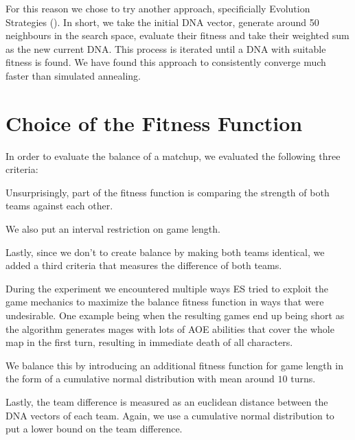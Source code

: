 For this reason we chose to try another approach, specificially Evolution
Strategies (). In short, we take the initial DNA vector,
generate around 50 neighbours in the search space, evaluate their fitness
and take their weighted sum as the new current DNA. This process is iterated
until a DNA with suitable fitness is found. We have found this approach to
consistently converge much faster than simulated annealing.

\section{Choice of the Fitness Function}

In order to evaluate the balance of a matchup, we evaluated the following three criteria:

\begin{description}[align=right,labelwidth=3cm]
\item [Balance] Unsurprisingly, part of the fitness function is comparing the strength of both teams against each other.
\item [Game length] We also put an interval restriction on game length.
\item [Team difference] Lastly, since we don't to create balance by making both teams identical, we added a third criteria
that measures the difference of both teams.
\end{description}

During the experiment we encountered multiple ways ES tried to exploit the
game mechanics to maximize the balance fitness function in ways that were
undesirable. One example being when the resulting games end up being short
as the algorithm generates mages with lots of AOE abilities that cover the
whole map in the first turn, resulting in immediate death of all characters.

We balance this by introducing an additional fitness function for game length
in the form of a cumulative normal distribution with mean around $10$ turns.

Lastly, the team difference is measured as an euclidean distance between the DNA
vectors of each team. Again, we use a cumulative normal distribution to put a lower
bound on the team difference.
